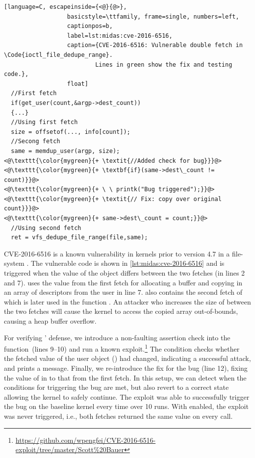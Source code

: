 \begin{lstlisting}[language=C, escapeinside={<@}{@>},
                  basicstyle=\ttfamily, frame=single, numbers=left,
                  captionpos=b,
                  label=lst:midas:cve-2016-6516,
                  caption={CVE-2016-6516: Vulnerable double fetch in \Code{ioctl_file_dedupe_range}.
                          Lines in green show the fix and testing code.},
                  float]
  //First fetch
  if(get_user(count,&argp->dest_count))
  {...}
  //Using first fetch
  size = offsetof(..., info[count]);
  //Secong fetch
  same = memdup_user(argp, size);
<@\texttt{\color{mygreen}{+ \textit{//Added check for bug}}}@>
<@\texttt{\color{mygreen}{+ \textbf{if}(same->dest\_count != count)}}@>
<@\texttt{\color{mygreen}{+ \ \ printk("Bug triggered");}}@>
<@\texttt{\color{mygreen}{+ \textit{// Fix: copy over original count}}}@>
<@\texttt{\color{mygreen}{+ same->dest\_count = count;}}@>
  //Using second fetch
  ret = vfs_dedupe_file_range(file,same);
\end{lstlisting}

CVE-2016-6516 is a known vulnerability in kernels prior to version
4.7 in a file-system .
The vulnerable code is shown in \autoref{lst:midas:cve-2016-6516} and is
triggered when the value of the  object differs between
the two fetches (in lines 2 and 7).
 uses the value from the first fetch for allocating a buffer
and copying in an array of descriptors from the user in line 7.
 also contains the second fetch of 
which is later used in the function .
An attacker who increases the size of  between the
two fetches will cause the kernel to access the copied array out-of-bounds,
causing a heap buffer overflow.

For verifying \midas' defense, we introduce a non-faulting assertion
check into the function~(lines 9--10) and run a known
exploit.\footnote{\url{https://github.com/wpengfei/CVE-2016-6516-exploit/tree/master/Scott\%20Bauer}}
The condition checks whether the fetched value of the user object ()
had changed, indicating a successful attack, and prints a message.
Finally, we re-introduce the fix for the bug (line 12), fixing the value of
 in  to that from the first fetch.
In this setup, we can detect when the conditions for triggering the bug are met,
but also revert to a correct state allowing the kernel to safely
continue.
The exploit was able to successfully trigger the bug on the baseline kernel
every time over 10 runs.
With \midas enabled, the exploit was never triggered, i.e., both fetches
returned the same value on every call.\\


